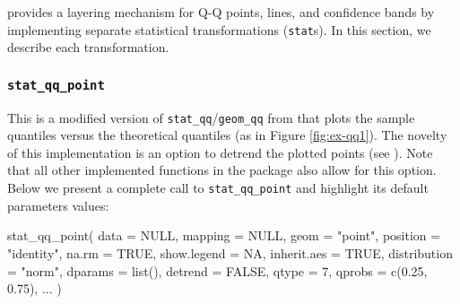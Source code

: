 \label{sec:implementing}

 provides a  layering mechanism for Q-Q
points, lines, and confidence bands by implementing separate statistical
transformations (\texttt{stat}s). In this section, we describe each
transformation.

\subsubsection{\texorpdfstring{\texttt{stat\_qq\_point}}{stat\_qq\_point}}\label{stat_qq_point}

This is a modified version of \texttt{stat\_qq}/\texttt{geom\_qq} from
 that plots the sample quantiles versus the theoretical
quantiles (as in Figure \ref{fig:ex-qq1}). The novelty of this
implementation is an option to detrend the plotted points (see
). Note that all other implemented functions in
the  package also allow for this option. Below we present a
complete call to \texttt{stat\_qq\_point} and highlight its default
parameters values:

\begin{Schunk}
\begin{Sinput}
stat_qq_point(
  data = NULL,
  mapping = NULL,
  geom = "point",
  position = "identity",
  na.rm = TRUE,
  show.legend = NA,
  inherit.aes = TRUE,
  distribution = "norm",
  dparams = list(),
  detrend = FALSE,
  qtype = 7,
  qprobs = c(0.25, 0.75),
  ...
  )
\end{Sinput}
\end{Schunk}

